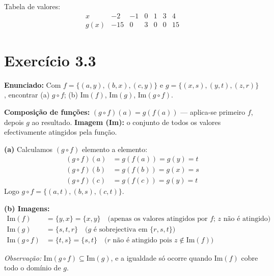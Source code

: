 \documentclass[12pt,a4paper]{article}
\begin{document}
Tabela de valores:
\[
\begin{array}{c|cccccc}
x & -2 & -1 & 0 & 1 & 3 & 4 \\\hline
g(x) & -15 & 0 & 3 & 0 & 0 & 15
\end{array}
\]

\section*{Exercício 3.3}

\textbf{Enunciado:} Com $f = \{(a,y),(b,x),(c,y)\}$ e $g = \{(x,s),(y,t),(z,r)\}$, encontrar (a) $g \circ f$; (b) $\text{Im}(f)$, $\text{Im}(g)$, $\text{Im}(g \circ f)$.

\begin{teoribox}
\textbf{Composição de funções:} $(g \circ f)(a) = g(f(a))$ --- aplica-se primeiro $f$, depois $g$ ao resultado. \textbf{Imagem (Im):} o conjunto de todos os valores efectivamente atingidos pela função.
\end{teoribox}

\textbf{(a)} Calculamos $(g \circ f)$ elemento a elemento:
\begin{align*}
(g \circ f)(a) &= g(f(a)) = g(y) = t \\
(g \circ f)(b) &= g(f(b)) = g(x) = s \\
(g \circ f)(c) &= g(f(c)) = g(y) = t
\end{align*}
Logo $g \circ f = \{(a,t),(b,s),(c,t)\}$.

\textbf{(b) Imagens:}
\begin{align*}
\text{Im}(f) &= \{y, x\} = \{x, y\} \quad \text{(apenas os valores atingidos por } f\text{; } z \text{ não é atingido)} \\
\text{Im}(g) &= \{s, t, r\} \quad \text{(} g \text{ é sobrejectiva em } \{r,s,t\}\text{)} \\
\text{Im}(g \circ f) &= \{t, s\} = \{s, t\} \quad \text{(} r \text{ não é atingido pois } z \notin \text{Im}(f)\text{)}
\end{align*}

\begin{notabox}
\textit{Observação:} $\text{Im}(g \circ f) \subseteq \text{Im}(g)$, e a igualdade só ocorre quando $\text{Im}(f)$ cobre todo o domínio de $g$.
\end{notabox}

\end{document}
